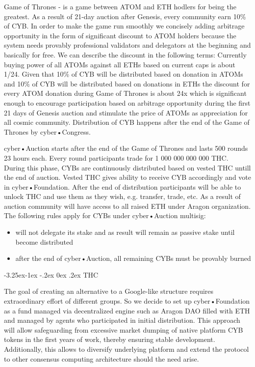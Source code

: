 \documentclass[8pt,oneside]{amsart}
\makeatletter
\renewcommand\subsection{\@startsection{subsection}{2}{\z@}%
                                     {-3.25ex\@plus -1ex \@minus -.2ex}%
                                     {0ex \@plus .2ex}%
                                     {\play\Large}}%
\newcommand{\titleSection}[1]{\subsection{#1}}
\makeatother
\begin{document}
Game of Thrones - is a game between ATOM and ETH hodlers for being the greatest. As a result of 21-day auction after Genesis, every community earn 10\% of CYB. In order to make the game run smoothly we concisely adding arbitrage opportunity in the form of significant discount to ATOM holders because the system needs provably professional validators and delegators at the beginning and basically for free. We can describe the discount in the following terms: Currently buying power of all ATOMs against all ETHs based on current caps is about 1/24. Given that 10\% of CYB will be distributed based on donation in ATOMs and 10\% of CYB will be distributed based on donations in ETHs the discount for every ATOM donation during Game of Thrones is about 24x which is significant enough to encourage participation based on arbitrage opportunity during the first 21 days of Genesis auction and stimulate the price of ATOMs as appreciation for all cosmic community. Distribution of CYB happens after the end of the Game of Thrones by cyber•Congress.

cyber•Auction starts after the end of the Game of Thrones and lasts 500 rounds 23 hours each. Every round participants trade for 1 000 000 000 000 THC. During this phase, CYBs are continuously distributed based on vested THC untill the end of auction. Vested THC gives ability to receive CYB accordingly and vote in cyber•Foundation. After the end of distribution participants will be able to unlock THC and use them as they wish, e.g. transfer, trade, etc. As a result of auction community will have access to all raised ETH under Aragon organization. The following rules apply for CYBs under cyber•Auction multisig:

\begin{itemize}
\item will not delegate its stake and as result will remain as passive stake until become distributed
\item after the end of cyber•Auction, all remaining CYBs must be provably burned
\end{itemize}

\titleSection{THC}\label{thc}

The goal of creating an alternative to a Google-like structure requires extraordinary effort of different groups. So we decide to set up cyber•Foundation as a fund managed via decentralized engine such as Aragon DAO filled with ETH and managed by agents who participated in initial distribution. This approach will allow safeguarding from excessive market dumping of native platform CYB tokens in the first years of work, thereby ensuring stable development. Additionally, this allows to diversify underlying platform and extend the protocol to other consensus computing architecture should the need arise.
\end{document}
